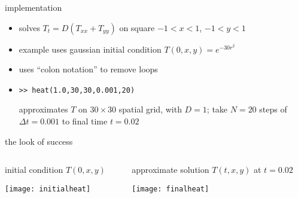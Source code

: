 \begin{frame}{implementation}


\small
\begin{itemize}
\item solves $T_t = D(T_{xx} + T_{yy})$ on square $-1 < x < 1$, $-1 < y < 1$
\item example uses gaussian initial condition $T(0,x,y) = e^{-30 r^2}$
\item uses ``colon notation'' to remove loops
\item \texttt{>>  heat(1.0,30,30,0.001,20)}

approximates $T$ on $30\times 30$ spatial grid, with $D=1$; take $N=20$ steps of $\Delta t = 0.001$ to final time $t = 0.02$
\end{itemize}
\end{frame}


\begin{frame}{the look of success}

\begin{columns}
\begin{column}{0.5\textwidth}
initial condition $T(0,x,y)$

\bigskip
\begin{center}
\texttt{[image: initialheat]}
\end{center}
\end{column}
\begin{column}{0.5\textwidth}
approximate solution $T(t,x,y)$ at $t=0.02$

\bigskip
\begin{center}
\texttt{[image: finalheat]}
\end{center}
\end{column}
\end{columns}
\end{frame}


